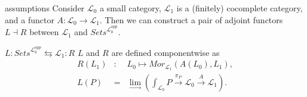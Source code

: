 \begin{frame}
\begin{block}{assumptions}
Consider $\mathcal{L}_0$ a small category, $\mathcal{L}_1$ is a (finitely) cocomplete category, and a functor $A : \mathcal{L}_0 \rightarrow \mathcal{L}_1$. Then we can construct a pair of adjoint functors $L \dashv R$ between $\mathcal{L}_1$ and $\textit{Sets}^{\mathcal{L}_0^{opp}}$.
\end{block}
\begin{block}{$L: \textit{Sets}^{\mathcal{L}_0^{opp}} \leftrightarrows \mathcal{L}_1 :R$}
$L$ and $R$ are defined componentwise as
\begin{eqnarray*}
R(L_1) &:& L_0 \mapsto Mor_{\mathcal{L}_1}(A(L_0),L_1),\\
L(P) &=& \lim\limits_{\longrightarrow} \left( \int_{\mathcal{L}_0} P \xrightarrow{\pi_P} \mathcal{L}_0 \xrightarrow{A} \mathcal{L}_1 \right) .
\end{eqnarray*}
\end{block}
\end{frame}
